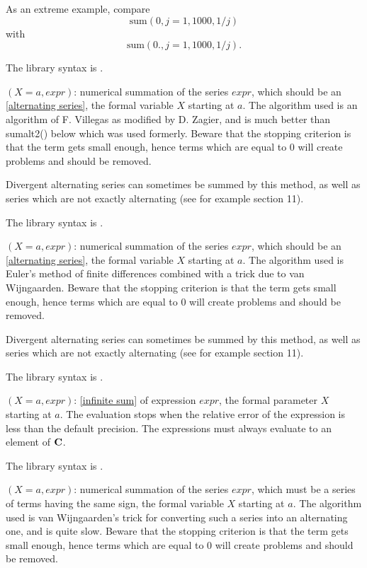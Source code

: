 As an extreme example, compare $$\text{sum}(0,j=1, 1000, 1/j)$$
with  $$\text{sum}(0.,j=1, 1000, 1/j ).$$

The library syntax is .

$(X=a, expr)$: numerical summation of the series $expr$,
which should be an \ref{alternating series}, the formal variable $X$ 
starting at $a$. The algorithm used is an algorithm of F. Villegas as modified by
D. Zagier, and is much better than sumalt2() below which was used formerly.
Beware that the stopping criterion is that the term gets small enough, hence
terms which are equal to 0 will create problems and should be removed.

Divergent alternating series can sometimes be summed by this method, as well as
series which are not exactly alternating (see for example section 11).

The library syntax is .

$(X=a, expr)$: numerical summation of the series $expr$,
which should be an \ref{alternating series}, the formal variable $X$ 
starting at $a$. The algorithm used is Euler's method of finite differences
combined with a trick due to van Wijngaarden.
Beware that the stopping criterion is that the term gets small enough, hence
terms which are equal to 0 will create problems and should be removed.

Divergent alternating series can sometimes be summed by this method, as well as
series which are not exactly alternating (see for example section 11).

The library syntax is .

$(X=a,expr)$: \ref{infinite sum} of expression $expr$, the 
formal parameter $X$ starting at $a$. The evaluation stops when the relative
error of the expression is less than the default precision. The expressions
must always evaluate to an element of $\Bbb C$.

The library syntax is .

$(X=a,expr)$: numerical summation of the series $expr$,
which must be a series of terms having the same sign, the formal variable $X$
starting at $a$. The algorithm used is van Wijngaarden's
trick for converting such a series into an alternating one, and is quite slow.
Beware that the stopping criterion is that the term gets small enough, hence
terms which are equal to 0 will create problems and should be removed.

